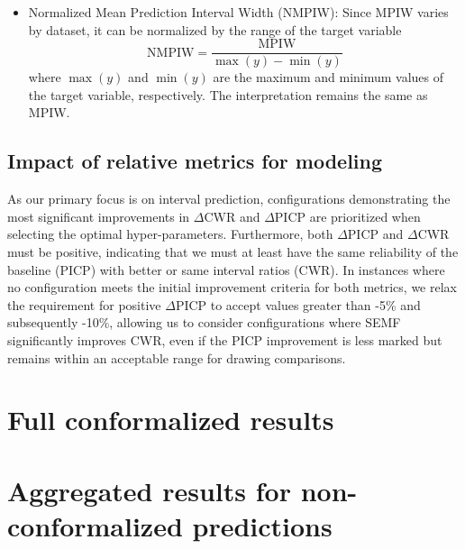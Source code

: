 \documentclass{article}
\begin{document}
\begin{appendix}
\begin{itemize}
    \item Normalized Mean Prediction Interval Width (NMPIW): Since MPIW varies by dataset, it can be normalized by the range of the target variable
    \begin{equation}
        \text{NMPIW} = \frac{\text{MPIW}}{\max(y) - \min(y)}
    \end{equation}
    where $\max(y)$ and $\min(y)$ are the maximum and minimum values of the target variable, respectively. The interpretation remains the same as MPIW.
\end{itemize}

\subsection{Impact of relative metrics for modeling}
\label{appendix:relative-metrics-impact}
As our primary focus is on interval prediction, configurations demonstrating the most significant improvements in $\Delta$CWR and $\Delta$PICP are prioritized when selecting the optimal hyper-parameters. Furthermore, both $\Delta$PICP and $\Delta$CWR must be positive, indicating that we must at least have the same reliability of the baseline (PICP) with better or same interval ratios (CWR). In instances where no configuration meets the initial improvement criteria for both metrics, we relax the requirement for positive $\Delta$PICP to accept values greater than -5\% and subsequently -10\%, allowing us to consider configurations where SEMF significantly improves CWR, even if the PICP improvement is less marked but remains within an acceptable range for drawing comparisons.

\newpage

\section{Full conformalized results}
\label{appendix:full-results}









\clearpage

\section{Aggregated results for non-conformalized predictions}
\label{appendix:non-conformal-aggregated}


\clearpage


\end{appendix}
\end{document}
